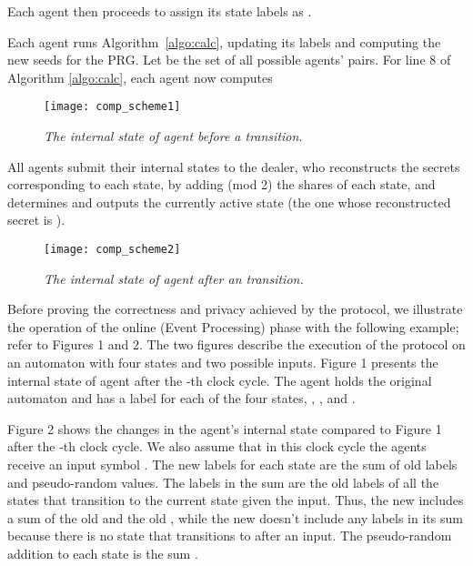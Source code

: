 \documentclass[letterpaper,11pt]{article}
\begin{document}
 
Each agent then proceeds to assign its state labels as
.


\vspace{.1in}
  Each agent runs Algorithm~\ref{algo:calc},
updating its labels and computing the new seeds for the PRG.  
Let  be the set of all possible agents' pairs. For line 8
of Algorithm \ref{algo:calc}, each agent  now computes



\begin{figure*} [ht]
\begin{center}
\texttt{[image: comp\_scheme1]}
\caption{\sl The internal state of agent  before a transition.}
\end{center}
\label{fig:comp_scheme1}
\end{figure*}

\vspace{.1in}
  All agents submit their internal states to the
dealer, who reconstructs the secrets  corresponding to each state, by 
adding (mod 2) the shares of each state, and determines and outputs 
the currently active state (the one whose reconstructed secret is ).



\begin{figure*} [ht]
\begin{center}
\texttt{[image: comp\_scheme2]}
\caption{\sl The internal state of agent  after an  transition.}
\end{center}
\label{fig:comp_scheme2}
\end{figure*}

\vspace{.1in}
Before proving the correctness and privacy achieved by the protocol, 
we illustrate the operation of the online (Event Processing) phase
with the following example;
refer to Figures 1
and 2.
The two figures describe the execution of the
protocol
on an automaton with four states and two possible
inputs. 
Figure 1 presents the 
internal state of agent  after the -th clock cycle. 
The agent holds the original automaton and has a label for each of 
the four states, 
, ,  and
.



Figure 2
shows the changes in the agent's internal state compared to Figure 1
after the -th clock cycle. We also assume
that in this clock cycle the agents receive an input symbol
. The new labels for each state are the sum of old labels and
pseudo-random values. The labels in the sum are the old labels of
all the states that transition to the current state given the
input. Thus, the new  includes a sum of the old
 and the old , while the new
 doesn't include any labels in its sum because there is
no state that transitions to  after an  input. The 
pseudo-random addition to each state  is the sum .
\end{document}
